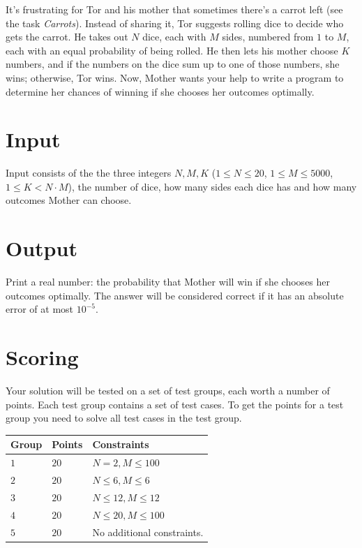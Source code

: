 \noindent
It's frustrating for Tor and his mother that sometimes there's a carrot left (see the task \emph{Carrots}).
Instead of sharing it, Tor suggests rolling dice to decide who gets the carrot. He takes out $N$ dice, each with $M$ sides,
numbered from $1$ to $M$, each with an equal probability of being rolled. He then lets his mother choose $K$ numbers,
and if the numbers on the dice sum up to one of those numbers, she wins; otherwise, Tor wins.
Now, Mother wants your help to write a program to determine her chances of winning if she chooses her outcomes optimally.


\section*{Input}
\noindent
Input consists of the the three integers $N, M, K$ ($1 \le N \le 20$, $1 \le M \le 5000$, $1 \le K < N \cdot M$), 
the number of dice, how many sides each dice has and how many outcomes Mother can choose.

\section*{Output}
\noindent
Print a real number: the probability that Mother will win if she chooses her outcomes optimally.
The answer will be considered correct if it has an absolute error of at most $10^{-5}$.


\section*{Scoring}
Your solution will be tested on a set of test groups, each worth a number of points. Each test group contains
a set of test cases. To get the points for a test group you need to solve all test cases in the test group.

\noindent
\begin{tabular}{| l | l | p{12cm} |}
  \hline
  \textbf{Group} & \textbf{Points} & \textbf{Constraints} \\ \hline
  $1$    & $20$        & $N=2,      M \le 100 $   \\ \hline 
  $2$    & $20$        & $N \le 6,  M \le 6 $  \\ \hline
  $3$    & $20$        & $N \le 12, M \le 12 $  \\ \hline 
  $4$    & $20$        & $N \le 20, M \le 100 $  \\ \hline
  $5$    & $20$        & No additional constraints. \\ \hline
\end{tabular}
